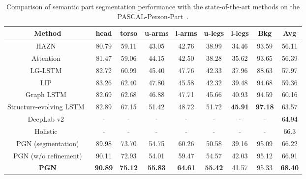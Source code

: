 \documentclass[runningheads]{llncs}
\begin{document}
\begin{table*}[t]
\centering
\small
\caption{Comparison of semantic part segmentation performance with the state-of-the-art methods on the PASCAL-Person-Part~\cite{chen2014detect}.}
\begin{tabular}{ccccccccc}
\toprule[0.7pt]
   Method                                         &  head  &  torso  &  u-arms &  l-arms &  u-legs &  l-legs &  Bkg   &  Avg    \\ \hline
   HAZN~\cite{xia2015zoom}                        & 80.79  &  59.11  &  43.05  &  42.76  &  38.99  &  34.46  &  93.59 &  56.11  \\
   Attention~\cite{chen2015attention}             & 81.47  &  59.06  &  44.15  &  42.50  &  38.28  &  35.62  &  93.65 &  56.39  \\
   LG-LSTM~\cite{liang2015semantic}               & 82.72  &  60.99  &  45.40  &  47.76  &  42.33  &  37.96  &  88.63 &  57.97  \\
   LIP~\cite{Gong_2017_CVPR}                      & 83.26  &  62.40  &  47.80  &  45.58  &  42.32  &  39.48  &  94.68 &  59.36  \\
   Graph LSTM~\cite{liang2016semantic}            & 82.69  &  62.68  &  46.88  &  47.71  &  45.66  &  40.93  &  94.59 &  60.16  \\
   Structure-evolving LSTM~\cite{Liang_2017_CVPR} & 82.89  &  67.15  &  51.42  &  48.72  &  51.72  & \textbf{45.91} & \textbf{97.18} &  63.57  \\
   DeepLab v2~\cite{chen2016deeplab}              &   -    &     -   &   -     &    -    &   -     &    -    &   -    &  64.94  \\
   Holistic~\cite{li2017holistic}                 &   -    &     -   &   -     &    -    &   -     &    -    &   -    &  66.3   \\\hline
   PGN (segmentation)                             & 89.98  &  73.70  & 54.75   &  60.26  &  50.58  &  39.16  &  95.09 &  66.22  \\
   PGN (w/o refinement)                           & 90.11  &  72.93  & 54.01   &  59.47  &  54.57  &  42.03  &  95.12 &  66.91  \\\hline
   \textbf{PGN}                               & \textbf{90.89}  &  \textbf{75.12}  &  \textbf{55.83}  &  \textbf{64.61}  &
                                                  \textbf{55.42}  &  41.57  &  95.33 &  \textbf{68.40}   \\
\toprule[0.7pt]
\end{tabular}
\vspace{-10mm}
\label{tab: pascal}
\end{table*}
\end{document}
